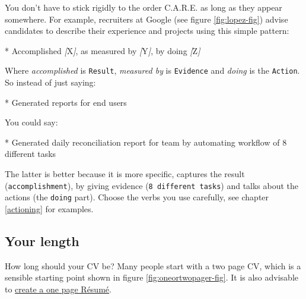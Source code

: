 \documentclass[
]{book}
\newenvironment{Shaded}{\begin{snugshade}}{\end{snugshade}}
\newcommand{\CommentTok}[1]{\textcolor[rgb]{0.56,0.35,0.01}{\textit{#1}}}
\newcommand{\NormalTok}[1]{#1}
\newcommand{\OtherTok}[1]{\textcolor[rgb]{0.56,0.35,0.01}{#1}}
\newcommand{\SpecialStringTok}[1]{\textcolor[rgb]{0.31,0.60,0.02}{#1}}
\begin{document}
You don't have to stick rigidly to the order C.A.R.E. as long as they appear somewhere. For example, recruiters at Google (see figure \ref{fig:lopez-fig}) advise candidates to describe their experience and projects using this simple pattern:

\begin{Shaded}
\begin{Highlighting}[]
\SpecialStringTok{* }\NormalTok{Accomplished }\CommentTok{[}\OtherTok{X}\CommentTok{]}\NormalTok{, as measured by }\CommentTok{[}\OtherTok{Y}\CommentTok{]}\NormalTok{, by doing }\CommentTok{[}\OtherTok{Z}\CommentTok{]}
\end{Highlighting}
\end{Shaded}

Where \emph{accomplished} is \texttt{Result}, \emph{measured by} is \texttt{Evidence} and \emph{doing} is the \texttt{Action}. So instead of just saying:

\begin{Shaded}
\begin{Highlighting}[]
\SpecialStringTok{* }\NormalTok{Generated reports for end users}
\end{Highlighting}
\end{Shaded}

You could say:

\begin{Shaded}
\begin{Highlighting}[]
\SpecialStringTok{* }\NormalTok{Generated daily reconciliation report for team by automating workflow of 8 different tasks}
\end{Highlighting}
\end{Shaded}

The latter is better because it is more specific, captures the result (\texttt{accomplishment}), by giving evidence (\texttt{8\ different\ tasks}) and talks about the actions (the \texttt{doing} part). Choose the verbs you use carefully, see chapter \ref{actioning} for examples.

\hypertarget{length}{%
\subsection{Your length}\label{length}}

How long should your CV be? Many people start with a two page CV, which is a sensible starting point shown in figure \ref{fig:oneortwopager-fig}. It is also advisable to \href{https://www.cv-library.co.uk/career-advice/cv/how-long-cv-be/}{create a one page Résumé}. \citep{howlong}
\end{document}
